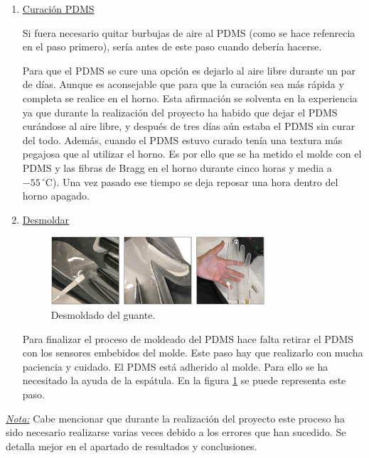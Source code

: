 \begin{itemize}
\begin{enumerate}
	
		\item \underline{Curación PDMS} 
		
		Si fuera necesario quitar burbujas de aire al PDMS (como se hace refenrecia en el paso primero), sería antes de este paso cuando debería hacerse.
		
		
		Para que el PDMS se cure una opción es dejarlo al aire libre durante un par de días. Aunque es aconsejable que para que la curación sea más rápida y completa se realice en el horno. Esta afirmación se solventa en la experiencia ya que durante la realización del proyecto ha habido que dejar el PDMS curándose al aire libre, y después de tres días aún estaba el PDMS sin curar del todo. Además, cuando el PDMS estuvo curado tenía una textura más pegajosa que al utilizar el horno. Es por ello que se ha metido el molde con el PDMS y las fibras de Bragg en el horno durante cinco horas y media a $-55\,^{\circ}\mathrm{C}$). Una vez pasado ese tiempo se deja reposar una hora dentro del horno apagado. 
		
		
		\item \underline{Desmoldar}
		
		\begin{figure}[H]
			\centering
			\includegraphics[width=0.75\textwidth]{./img/fabricacionGuante2}
			\caption{Desmoldado del guante.} \label{fig:fabricacionGuante2}
		\end{figure}
	
		Para finalizar el proceso de moldeado del PDMS hace falta retirar el PDMS con los sensores embebidos del molde. Este paso hay que realizarlo con mucha paciencia y cuidado. El PDMS está adherido al molde. Para ello se ha necesitado la ayuda de la espátula. En la figura \ref{fig:fabricacionGuante2} se puede representa este paso.
		

	\end{enumerate}
	
\underline{\textit{Nota:}} Cabe mencionar que durante la realización del proyecto este proceso ha sido necesario realizarse varias veces debido a los errores que han sucedido. Se detalla mejor en el apartado de resultados y conclusiones.
		


\end{itemize}
